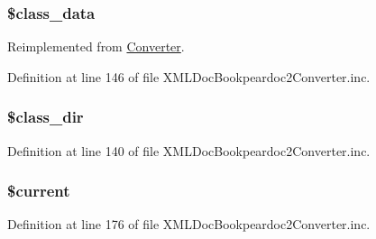 \hypertarget{class_x_m_l_doc_bookpeardoc2_converter_afdb3770ba45b6d4db2c00c8c18832482}{
\subsubsection[{\$class\-\_\-data}]{\setlength{\rightskip}{0pt plus 5cm}\$class\-\_\-data}}\label{class_x_m_l_doc_bookpeardoc2_converter_afdb3770ba45b6d4db2c00c8c18832482}


\-Reimplemented from \hyperlink{class_converter_afdb3770ba45b6d4db2c00c8c18832482}{\-Converter}.



\-Definition at line 146 of file \-X\-M\-L\-Doc\-Bookpeardoc2\-Converter.\-inc.

\hypertarget{class_x_m_l_doc_bookpeardoc2_converter_aaeaa82d379050faafbb4bf4b82733c94}{
\subsubsection[{\$class\-\_\-dir}]{\setlength{\rightskip}{0pt plus 5cm}\$class\-\_\-dir}}\label{class_x_m_l_doc_bookpeardoc2_converter_aaeaa82d379050faafbb4bf4b82733c94}


\-Definition at line 140 of file \-X\-M\-L\-Doc\-Bookpeardoc2\-Converter.\-inc.

\hypertarget{class_x_m_l_doc_bookpeardoc2_converter_a2c4c58e377f6c66ca38c8ea97666fc5e}{
\subsubsection[{\$current}]{\setlength{\rightskip}{0pt plus 5cm}\$current}}\label{class_x_m_l_doc_bookpeardoc2_converter_a2c4c58e377f6c66ca38c8ea97666fc5e}


\-Definition at line 176 of file \-X\-M\-L\-Doc\-Bookpeardoc2\-Converter.\-inc.

